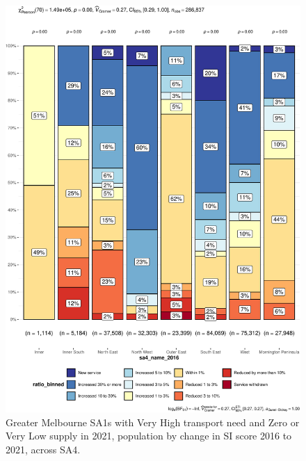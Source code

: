 \documentclass[preprint, 3p,
authoryear]{elsarticle} %
\begin{document}
\begin{figure}
\centering
\includegraphics{Leveraging_GTFS_to_assess_transit_supply_Transport_Geography_files/figure-latex/Greater_Melbourne_2016_needs_gap_SA4_service_change-1.pdf}
\caption{Greater Melbourne SA1s with Very High transport need and Zero
or Very Low supply in 2021, population by change in SI score 2016 to
2021, across SA4.}
\end{figure}
\end{document}
